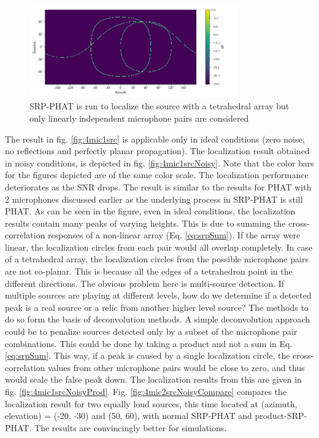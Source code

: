 \begin{figure}[h]
    \centering
    \includegraphics[width=0.8\textwidth]{Figures/Ind4mic1src.png}
    \caption{SRP-PHAT is run to localize the source with a tetrahedral array but only linearly independent microphone pairs are considered}
    \label{fig:4mic1srcInd}
\end{figure}
The result in fig. \ref{fig:4mic1src} is applicable only in ideal conditions (zero noise, no reflections and perfectly planar propagation). The localization result obtained in noisy conditions, is depicted in fig. \ref{fig:4mic1srcNoisy}. Note that the color bars for the figures depicted are of the same color scale. The localization performance deteriorates as the SNR drops. The result is similar to the results for PHAT with 2 microphones discussed earlier as the underlying process in SRP-PHAT is still PHAT. As can be seen in the figure, even in ideal conditions, the localization results contain many peaks of varying heights. This is due to summing the cross-correlation responses of a non-linear array (Eq. \ref{eq:srpSum}). If the array were linear, the localization circles from each pair would all overlap completely. In case of a tetrahedral array, the localization circles from the possible microphone pairs are not co-planar. This is because all the edges of a tetrahedron point in the different directions. The obvious problem here is multi-source detection. If multiple sources are playing at different levels, how do we determine if a detected peak is a real source or a relic from another higher level source? The methods to do so form the basis of deconvolution methods. A simple deconvolution approach could be to penalize sources detected only by a subset of the microphone pair combinations. This could be done by taking a product and not a sum in Eq. \ref{eq:srpSum}. This way, if a peak is caused by a single localization circle, the cross-correlation values from other microphone pairs would be close to zero, and thus would scale the false peak down. The localization results from this are given in fig. \ref{fig:4mic1srcNoisyProd}. Fig. \ref{fig:4mic2srcNoisyCompare} compares the localization result for two equally loud sources, this time located at (azimuth, elevation) = (-20, -30) and (50, 60), with normal SRP-PHAT and product-SRP-PHAT. The results are convincingly better for simulations.  

